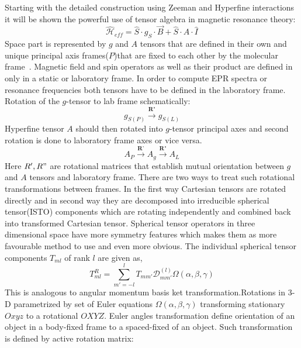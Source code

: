 Starting with the detailed construction using Zeeman and Hyperfine interactions it will be shown the powerful use of tensor algebra in magnetic resonance theory:   
\begin{equation}\label{eq:39}
\mathcal{\hat{H}}_{eff}=\hat{S}\cdot g_S\cdot \vec{B}+\hat{S}\cdot A \cdot \hat{I}
\end{equation} 
Space part is represented by $g$ and $A$ tensors that are defined in their own and unique principal axis frames($P$)that are fixed to each other by the molecular frame~\cite{marina}. Magnetic field and spin operators as well as their product are defined in only in a static or laboratory frame. In order to compute EPR spectra or resonance frequencies both tensors have to be defined in the laboratory frame. Rotation of the $g$-tensor to lab frame schematically:  
\begin{equation}\label{eq:40}
 g_{S(P)}\xrightarrow{\textbf{R"}}g_{S(L)}
\end{equation}
Hyperfine tensor $A$ should then rotated into $g$-tensor principal axes and second rotation is done to laboratory frame axes or vice versa. 
\begin{equation}\label{eq:41}
  A_{P}\xrightarrow{\textbf{R'}}A_{g}\xrightarrow{\textbf{R"}}A_{L}
\end{equation}
Here $R', R"$ are rotational matrices that establish mutual orientation between $g$ and $A$ tensors and laboratory frame. There are two ways to treat such rotational transformations between frames. In the first way Cartesian tensors are rotated directly and in second way they are decomposed into irreducible spherical tensor(ISTO) components which are rotating independently and combined back into transformed Cartesian tensor. Spherical tensor operators in three dimensional space have more symmetry features which makes them as more favourable method to use and even more obvious\cite{duer}. The individual spherical tensor components $T_{ml}$ of rank $l$ are given as,     
\begin{equation}\label{eq:42}
  T^{R}_{ml}=\sum_{m'=-l}^lT_{mm'}\mathcal{D}^{(l)}_{mm'}\Omega(\alpha,\beta,\gamma)
\end{equation}
This is analogous to angular momentum basis ket transformation.Rotations in 3-D parametrized by set of Euler equations $\Omega(\alpha,\beta,\gamma)$ transforming stationary $Oxyz$ to a rotational $OXYZ$. Euler angles transformation define orientation of an object in a body-fixed frame to a spaced-fixed of an object. Such transformation is defined by active rotation matrix\cite{bouten}\cite{mul}: 
